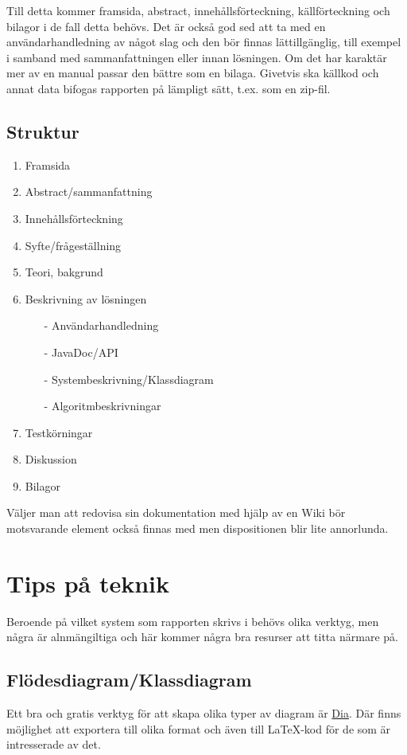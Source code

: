 \documentclass[11pt,a4paper]{article}
\begin{document}
    Till detta kommer framsida, abstract, innehållsförteckning, källförteckning och bilagor i de fall detta behövs.
    Det är också god sed att ta med en användarhandledning av något slag och den bör finnas lättillgänglig, till exempel
    i samband med sammanfattningen eller innan lösningen. Om det har karaktär mer av en manual passar den bättre som en bilaga.
    Givetvis ska källkod och annat data bifogas rapporten på lämpligt sätt, t.ex. som en zip-fil.

    \newpage

    \subsection{Struktur}
    \begin{enumerate}
        \item Framsida
        \item Abstract/sammanfattning
        \item Innehållsförteckning
        \item Syfte/frågeställning
        \item Teori, bakgrund
        \item Beskrivning av lösningen
        \begin{itemize}
            \item[-] Användarhandledning
            \item[-] JavaDoc/API
            \item[-] Systembeskrivning/Klassdiagram
            \item[-] Algoritmbeskrivningar
        \end{itemize}
        \item Testkörningar
        \item Diskussion
        \item Bilagor
    \end{enumerate}

    Väljer man att redovisa sin dokumentation med hjälp av en Wiki bör motsvarande element också finnas med men dispositionen blir lite annorlunda.


    \section{Tips på teknik}
    Beroende på vilket system som rapporten skrivs i behövs olika verktyg, men några är alnmängiltiga och här kommer några bra resurser att titta närmare på.
    \subsection{Flödesdiagram/Klassdiagram}
    Ett bra och gratis verktyg för att skapa olika typer av diagram är \href{http://dia-installer.de/index.html.en}{Dia}. Där finns möjlighet att exportera till olika format och även till \LaTeX{}-kod för de som är intresserade av det.
\end{document}

